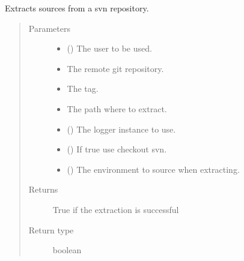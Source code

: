 \documentclass[a4paper,10pt,english]{sphinxmanual}
\begin{document}
\begin{fulllineitems}
\label{\detokenize{commands/apidoc/src:src.system.svn_extract}}
Extracts sources from a svn repository.
\begin{quote}\begin{description}
\item[{Parameters}] \leavevmode\begin{itemize}
\item {} 
 () \textendash{} The user to be used.

\item {} 
 \textendash{} The remote git repository.

\item {} 
 \textendash{} The tag.

\item {} 
 \textendash{} The path where to extract.

\item {} 
 () \textendash{} The logger instance to use.

\item {} 
 () \textendash{} If true use checkout svn.

\item {} 
 () \textendash{} The environment to source when
extracting.

\end{itemize}

\item[{Returns}] \leavevmode
True if the extraction is successful

\item[{Return type}] \leavevmode
boolean

\end{description}\end{quote}

\end{fulllineitems}
\end{document}
